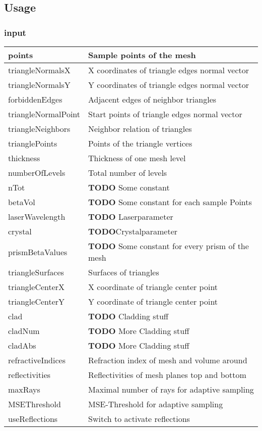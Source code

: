 \subsection{Usage}
\subsubsection{input}
\begin{tabular}{| p{3cm} | p{4cm} |}
  \hline
  points & Sample points of the mesh \\\hline
  triangleNormalsX & X coordinates of triangle edges normal vector \\\hline
  triangleNormalsY & Y coordinates of triangle edges normal vector \\\hline
  forbiddenEdges & Adjacent edges of neighbor triangles\\\hline
  triangleNormalPoint & Start points of triangle edges normal vector \\\hline
  triangleNeighbors & Neighbor relation of triangles \\\hline
  trianglePoints & Points of the triangle vertices \\\hline
  thickness & Thickness of one mesh level \\\hline
  numberOfLevels & Total number of levels \\\hline
  nTot & \textbf{TODO} Some constant \\\hline
  betaVol & \textbf{TODO} Some constant for each sample Points \\\hline
  laserWavelength & \textbf{TODO} Laserparameter \\\hline
  crystal & \textbf{TODO}Crystalparameter \\\hline
  prismBetaValues & \textbf{TODO} Some constant for every prism of the mesh \\\hline
  triangleSurfaces & Surfaces of triangles \\\hline
  triangleCenterX & X coordinate of triangle center point\\\hline
  triangleCenterY & Y coordinate of triangle center point\\\hline
  clad & \textbf{TODO} Cladding stuff \\\hline
  cladNum & \textbf{TODO} More Cladding stuff \\\hline
  cladAbs & \textbf{TODO} More Cladding stuff \\\hline
  refractiveIndices &  Refraction index of mesh and volume around \\\hline
  reflectivities & Reflectivities of mesh planes top and bottom \\\hline
  maxRays & Maximal number of rays for adaptive sampling \\\hline
  MSEThreshold & MSE-Threshold for adaptive sampling \\\hline
  useReflections & Switch to activate reflections \\\hline
\end{tabular}

